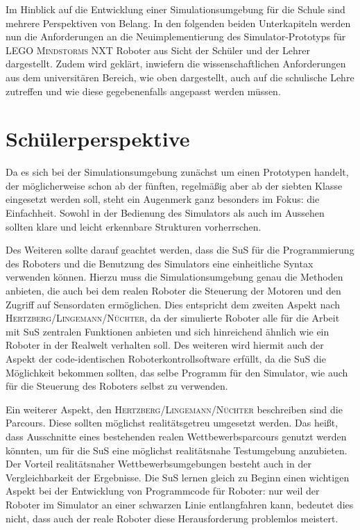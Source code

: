 \documentclass[paper=a4, DIV=calc, BCOR=12mm, twoside=on, onecolumn=on, open = right, titlepage =on, parskip =half-, headsepline = on, footsepline = off, chapterprefix = off, appendixprefix = on, fontsize = 12pt, numbers = noenddot, abstract = on]{scrbook}
\begin{document}
Im Hinblick auf die Entwicklung einer Simulationsumgebung für die Schule sind mehrere Perspektiven von Belang. 
In den folgenden beiden Unterkapiteln werden nun die Anforderungen an die Neuimplementierung des Simulator-Prototyps für \textsc{LEGO Mindstorms} NXT Roboter aus Sicht der Schüler und der Lehrer dargestellt. Zudem wird geklärt, inwiefern die wissenschaftlichen Anforderungen aus dem universitären Bereich, wie oben dargestellt, auch auf die schulische Lehre zutreffen und wie diese gegebenenfalls angepasst werden müssen.
\vspace*{-1ex}
\par \singlespacing
\section{Schülerperspektive}
\label{sec:schüler}
\onehalfspacing

Da es sich bei der Simulationsumgebung zunächst um einen Prototypen handelt, der möglicherweise schon ab der fünften, regelmäßig aber ab der siebten Klasse eingesetzt werden soll, steht ein Augenmerk ganz besonders im Fokus: die Einfachheit. Sowohl in der Bedienung des Simulators als auch im Aussehen sollten klare und leicht erkennbare Strukturen vorherrschen.

Des Weiteren sollte darauf geachtet werden, dass die SuS für die Programmierung des Roboters und die Benutzung des Simulators eine einheitliche Syntax verwenden können. Hierzu muss die Simulationsumgebung genau die Methoden anbieten, die auch bei dem realen Roboter die Steuerung der Motoren und den Zugriff auf Sensordaten ermöglichen. Dies entspricht dem zweiten Aspekt nach \textsc{Hertz\-berg\-/\-Lin\-ge\-mann\-/Nüch\-ter}, da der simulierte Roboter alle für die Arbeit mit SuS zentralen Funktionen anbieten und sich hinreichend ähnlich wie ein Roboter in der Realwelt verhalten soll. Des weiteren wird hiermit auch der Aspekt der code-identischen Roboterkontrollsoftware erfüllt, da die SuS die Möglichkeit bekommen sollten, das selbe Programm für den Simulator, wie auch für die Steuerung des Roboters selbst zu verwenden.

Ein weiterer Aspekt, den \textsc{Hertz\-berg\-/\-Lin\-ge\-mann\-/Nüch\-ter} beschreiben sind die Parcours. Diese sollten möglichst realitätsgetreu umgesetzt werden. Das heißt, dass Ausschnitte eines bestehenden realen Wettbewerbsparcours genutzt werden könnten, um für die SuS eine möglichst realitätsnahe Testumgebung anzubieten. Der Vorteil realitätsnaher Wettbewerbsumgebungen besteht auch in der Vergleichbarkeit der Ergebnisse. Die SuS lernen gleich zu Beginn einen wichtigen Aspekt bei der Entwicklung von Programmcode für Roboter: nur weil der Roboter im Simulator an einer schwarzen Linie entlangfahren kann, bedeutet dies nicht, dass auch der reale Roboter diese Herausforderung problemlos meistert.
\end{document}
